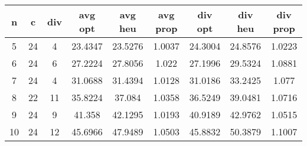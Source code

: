 \begin{tabular}{ c || c | c || c | c | c || c | c | c | }
{\bf n} & {\bf c} & {\bf div} & {\bf avg opt} & {\bf avg heu} & {\bf avg prop} & {\bf div opt} & {\bf div heu} & {\bf div prop} \\ \hline
5 & 24 & 4 & 23.4347 & 23.5276 & 1.0037 & 24.3004 & 24.8576 & 1.0223 \\ \hline
6 & 24 & 6 & 27.2224 & 27.8056 & 1.022 & 27.1996 & 29.5324 & 1.0881 \\ \hline
7 & 24 & 4 & 31.0688 & 31.4394 & 1.0128 & 31.0186 & 33.2425 & 1.077 \\ \hline
8 & 22 & 11 & 35.8224 & 37.084 & 1.0358 & 36.5249 & 39.0481 & 1.0716 \\ \hline
9 & 24 & 9 & 41.358 & 42.1295 & 1.0193 & 40.9189 & 42.9762 & 1.0515 \\ \hline
10 & 24 & 12 & 45.6966 & 47.9489 & 1.0503 & 45.8832 & 50.3879 & 1.1007 \\ \hline
\end{tabular}